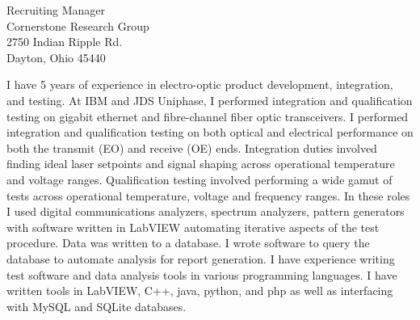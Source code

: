 \documentclass{letter} %
\newcommand{\contactperson}{Recruiting Manager}
\newcommand{\contactCompany}{Cornerstone Research Group}
\newcommand{\contactStreetAddress}{2750 Indian Ripple Rd.}
\newcommand{\contactCityStateZip}{Dayton, Ohio 45440 }
\begin{document}
\begin{letter}{\contactperson \\
\contactCompany \\
\contactStreetAddress \\
\contactCityStateZip

}
\noindent
I have 5 years of experience in electro-optic product development, integration, and testing.
At IBM and JDS Uniphase, I performed integration and qualification testing on gigabit ethernet and fibre-channel fiber optic transceivers.  I performed integration and qualification testing on both optical and electrical performance on both the transmit (EO) and receive (OE) ends. Integration duties involved finding ideal laser setpoints and signal shaping across operational temperature and voltage ranges. 
Qualification testing involved performing a wide gamut of tests across operational temperature, voltage and frequency ranges. In these roles I used digital communications analyzers, spectrum analyzers, pattern generators with software written in LabVIEW automating iterative aspects of the test procedure. Data was written to a database. I wrote software to query the database to automate analysis for report generation.
I have experience writing test software and data analysis tools in various programming languages. I have written tools in LabVIEW, C++, java, python, and php as well as interfacing with MySQL and SQLite databases.


\end{letter}
\end{document}
